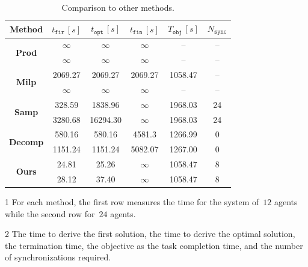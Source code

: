 \begin{table}\footnotesize
  \centering
  \begin{threeparttable}
	\caption{Comparison to other methods.}
	\label{table:compare_time}
	\begin{tabular}{|c|c|c|c|c|c|}\hline
	  \tnote{1} Method & \tnote{2} $t_{\texttt{fir}}\, [s]$
          & \tnote{2} $t_{\texttt{opt}}\, [s]$
	  & \tnote{2} $t_{\texttt{fin}}\,[s]$ & \tnote{2}$T_{\texttt{obj}}\,[s]$
          & \tnote{2} $N_{\texttt{sync}}$ \\ \hline
		\multirow{2}{*}{\textbf{Prod}}& $\infty$ & $\infty$ & $\infty$ & -- & -- \\
                 & $\infty$ & $\infty$ & $\infty$ & -- & -- \\
                \hline
		\multirow{2}{*}{\textbf{Milp}} & 2069.27 & 2069.27 & 2069.27 & 1058.47 & -- \\
                &$\infty$ &$\infty$ & $\infty$ & -- & --  \\
                \hline
		\multirow{2}{*}{\textbf{Samp}} & 328.59 & 1838.96 & $\infty$ & 1968.03 & 24 \\
                 & 3280.68 &  16294.30 & $\infty$ & 1968.03 & 24 \\
                \hline
		\multirow{2}{*}{\textbf{Decomp}} & 580.16 & 580.16 & 4581.3 & 1266.99 & 0 \\
		 & 1151.24 & 1151.24 & 5082.07 & 1267.00 & 0 \\
                \hline
		\multirow{2}{*}{\textbf{Ours}} & 24.81 & 25.26 & $\infty$ & 1058.47 & 8 \\
                 & 28.12 & 37.40 & $\infty$ & 1058.47 & 8 \\
		\hline
	\end{tabular}
  \begin{tablenotes}
  \item[1] For each method, the first row  measures the time for the
    system of~$12$ agents while the second row for~$24$ agents.
  \item[2] The time to derive the first solution,
    the time to derive the optimal solution,
    the termination time, the objective as the task completion time,
and the number of synchronizations required.
  \end{tablenotes}
   \end{threeparttable}
\end{table}

